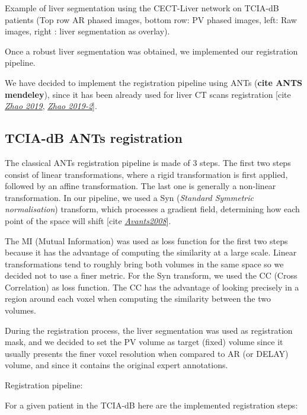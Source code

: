 \documentclass[]{article}
\begin{document}
Example of liver segmentation using the CECT-Liver network on TCIA-dB
patients (Top row AR phased images, bottom row: PV phased images, left:
Raw images, right : liver segmentation as overlay).

Once a robust liver segmentation was obtained, we implemented our
registration pipeline.

We have decided to implement the registration pipeline using ANTs
(\textbf{cite ANTS mendeley}), since it has been already used for liver
CT scans registration {[}cite
\href{https://openaccess.thecvf.com/content_ICCV_2019/papers/Zhao_Recursive_Cascaded_Networks_for_Unsupervised_Medical_Image_Registration_ICCV_2019_paper.pdf}{\emph{Zhao
2019}}, \href{https://arxiv.org/pdf/1902.05020.pdf}{\emph{Zhao
2019-2}}{]}.

\subsection{TCIA-dB ANTs registration}\label{tcia-db-ants-registration}

The classical ANTs registration pipeline is made of 3 steps. The first
two steps consist of linear transformations, where a rigid
transformation is first applied, followed by an affine transformation.
The last one is generally a non-linear transformation. In our pipeline,
we used a Syn (\emph{Standard Symmetric normalisation}) transform, which
processes a gradient field, determining how each point of the space will
shift {[}cite
\href{https://sci-hub.do/10.1016/j.media.2007.06.004}{\emph{Avants2008}}{]}.

The MI (Mutual Information) was used as loss function for the first two
steps because it has the advantage of computing the similarity at a
large scale. Linear transformations tend to roughly bring both volumes
in the same space so we decided not to use a finer metric. For the Syn
transform, we used the CC (Cross Correlation) as loss function. The CC
has the advantage of looking precisely in a region around each voxel
when computing the similarity between the two volumes.

During the registration process, the liver segmentation was used as
registration mask, and we decided to set the PV volume as target (fixed)
volume since it usually presents the finer voxel resolution when
compared to AR (or DELAY) volume, and since it contains the original
expert annotations.

Registration pipeline:

For a given patient in the TCIA-dB here are the implemented registration
steps:
\end{document}
